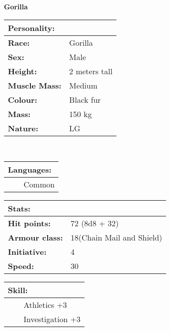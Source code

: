 \documentclass[11pt]{article}
\newcommand{\tabitem}{~~\llap{--}~~}
\begin{document}
	\begin{center}
\Huge \textbf{Gorilla}
	\end{center}
	\begin{multicols}{2}
\noindent \begin{tabularx}{\linewidth}{@{}l l}
\Large \textbf{Personality:} 	& 						\\
\hline
\textbf{Race:} 					& Gorilla	 			\\
\textbf{Sex:} 					& Male 					\\
\textbf{Height:} 				& 2 meters tall		 	\\
\textbf{Muscle Mass:} 			& Medium 				\\
\textbf{Colour:} 				& Black fur			 	\\
\textbf{Mass:} 					& 150 kg		 		\\
\textbf{Nature:} 				& LG
		\end{tabularx} \\

\vspace{4mm}

\noindent \begin{tabularx}{\linewidth}{@{}l}
{\Large \textbf{Languages:}} \\
\hline
\tabitem Common \\
		\end{tabularx}

\vspace{4mm}

\noindent \begin{tabularx}{\linewidth}{@{}l l}
\Large \textbf{Stats:}		 	& 									\\
\hline
\textbf{Hit points:} 			& 72 (8d8 + 32) 					\\
\textbf{Armour class:} 			& 18(Chain Mail and Shield) 		\\
\textbf{Initiative:} 			& 4									\\
\textbf{Speed:} 				& 30		 						\\
		\end{tabularx}

\vspace{2mm}

\noindent \begin{tabularx}{\linewidth}{@{}l}
{\Large \textbf{Skill:}} \\
\hline
\tabitem Athletics +3 \\
\tabitem Investigation +3
		\end{tabularx}

\vspace{4mm}


\end{multicols}
\end{document}
